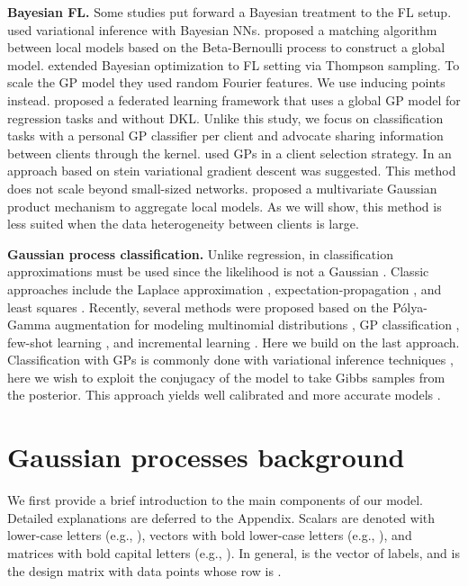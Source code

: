 \documentclass{article}
\newcommand{\pg}{P\'olya-Gamma }
\begin{document}
\textbf{Bayesian FL.}
Some studies put forward a Bayesian treatment to the FL setup. \cite{bui2018partitioned, corinzia2019variational} used variational inference with Bayesian NNs. \cite{wang2019federated, yurochkin2019bayesian} proposed a matching algorithm between local models based on the Beta-Bernoulli process to construct a global model. \cite{dai2020federated} extended Bayesian optimization to FL setting via Thompson sampling. To scale the GP model they used random Fourier features. We use inducing points instead.
\cite{yin2020fedloc} proposed a federated learning framework that uses a global GP model for regression tasks and without DKL. Unlike this study, we focus on classification tasks with a personal GP classifier per client and advocate sharing information between clients through the kernel. \cite{tang2021fedgp} used GPs in a client selection strategy. In \cite{kassab2020federated} an approach based on stein variational gradient descent was suggested. This method does not scale beyond small-sized networks. \cite{liu2021bayesian} proposed a multivariate Gaussian product mechanism to aggregate local models. As we will show, this method is less suited when the data heterogeneity between clients is large.

\textbf{Gaussian process classification.} 
Unlike regression, in classification approximations must be used since the likelihood is not a Gaussian \cite{gp_book}. Classic approaches include the Laplace approximation \cite{williams1998bayesian}, expectation-propagation \cite{minka2001family}, and least squares \cite{rifkin2004defense}. Recently, several methods were proposed based on the \pg augmentation \cite{polya_gamma} for modeling multinomial distributions \cite{linderman2015dependent}, GP classification \cite{ galy2020multi, galy2020automated, WenzelGDKO19}, few-shot learning \cite{snell2020bayesian}, and incremental learning \cite{achituve2021gp_icml}. Here we build on the last approach. Classification with GPs is commonly done with variational inference techniques \cite{hensman2015scalable}, here we wish to exploit the conjugacy of the model to take Gibbs samples from the posterior. This approach yields well calibrated \cite{snell2020bayesian} and more accurate models \cite{achituve2021gp_icml}.


\section{Gaussian processes background} \label{sec:background}

We first provide a brief introduction to the main components of our model. Detailed explanations are deferred to the Appendix. Scalars are denoted with lower-case letters (e.g., ), vectors with bold lower-case letters (e.g., ), and matrices with bold capital letters (e.g., ). In general,  is the vector of labels, and  is the design matrix with  data points whose  row is .
\end{document}
